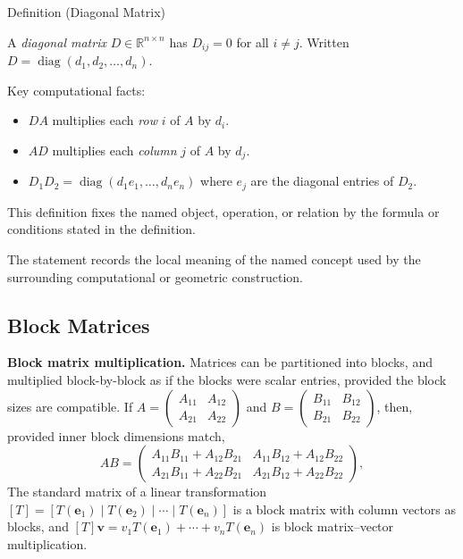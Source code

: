 \begin{definitionbox}{Definition (Diagonal Matrix)}
\begin{definition}
\label{def:diagonal-matrix}
A \emph{diagonal matrix} $D \in \mathbb{R}^{n \times n}$ has $D_{ij} = 0$
for all $i \neq j$.
Written $D = \operatorname{diag}(d_1, d_2, \ldots, d_n)$.

Key computational facts:
\begin{itemize}
  \item $DA$ multiplies each \emph{row} $i$ of $A$ by $d_i$.
  \item $AD$ multiplies each \emph{column} $j$ of $A$ by $d_j$.
  \item $D_1 D_2 = \operatorname{diag}(d_1 e_1, \ldots, d_n e_n)$ where $e_j$ are the diagonal entries of $D_2$.
\end{itemize}
\end{definition}
\end{definitionbox}
\begin{remark*}
This definition fixes the named object, operation, or relation by the formula
or conditions stated in the definition.
\end{remark*}

\begin{remark*}[Interpretation]
The statement records the local meaning of the named concept used by the
surrounding computational or geometric construction.
\end{remark*}

\DefinitionalRoot

\subsection*{Block Matrices}

\begin{remark*}[Exposition]
\textbf{Block matrix multiplication.}
Matrices can be partitioned into blocks, and multiplied block-by-block
as if the blocks were scalar entries, provided the block sizes are
compatible.
If $A = \begin{pmatrix} A_{11} & A_{12} \\ A_{21} & A_{22} \end{pmatrix}$
and $B = \begin{pmatrix} B_{11} & B_{12} \\ B_{21} & B_{22} \end{pmatrix}$,
then, provided inner block dimensions match,
\[
  AB = \begin{pmatrix}
    A_{11}B_{11} + A_{12}B_{21} & A_{11}B_{12} + A_{12}B_{22} \\
    A_{21}B_{11} + A_{22}B_{21} & A_{21}B_{12} + A_{22}B_{22}
  \end{pmatrix},
\]
The standard matrix of a linear transformation $[T] = [T(\mathbf{e}_1) \mid T(\mathbf{e}_2) \mid \cdots \mid T(\mathbf{e}_n)]$
is a block matrix with column vectors as blocks, and
$[T]\mathbf{v} = v_1 T(\mathbf{e}_1) + \cdots + v_n T(\mathbf{e}_n)$
is block matrix--vector multiplication.
\end{remark*}
